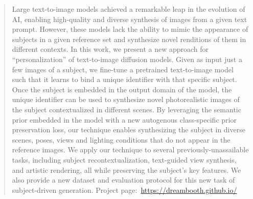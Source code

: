 \begin{abstract}
Large text-to-image models achieved a remarkable leap in the evolution of AI, enabling high-quality and diverse synthesis of images from a given text prompt. However, these models lack the ability to mimic the appearance of subjects in a given reference set and synthesize novel renditions of them in different contexts. In this work, we present a new approach for ``personalization'' of text-to-image diffusion models. Given as input just a few images of a subject, we fine-tune a pretrained text-to-image model such that it learns to bind a unique identifier with that specific subject. Once the subject is embedded in the output domain of the model, the unique identifier can be used to synthesize novel photorealistic images of the subject contextualized in different scenes. By leveraging the semantic prior embedded in the model with a new autogenous class-specific prior preservation loss, our technique enables synthesizing the subject in diverse scenes, poses, views and lighting conditions that do not appear in the reference images. We apply our technique to several previously-unassailable tasks, including subject recontextualization, text-guided view synthesis, and artistic rendering, all while preserving the subject's key features. We also provide a new dataset and evaluation protocol for this new task of subject-driven generation. Project page:~\small{\url{https://dreambooth.github.io/}}
\end{abstract}